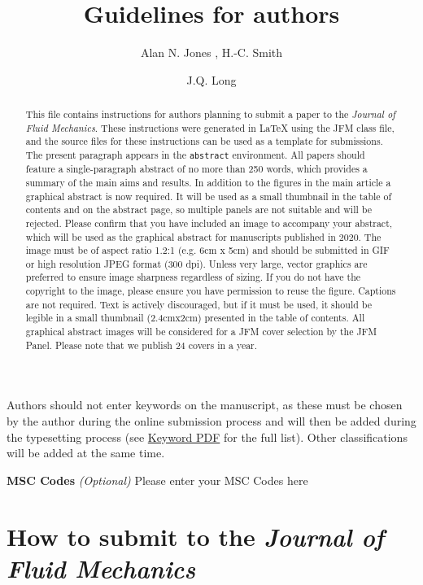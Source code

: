 \documentclass[lineno]{jfm}
\title{Guidelines for authors}
\author{Alan N. Jones\aff{1}
  \corresp{\email{JFMEditorial@cambridge.org}},
  H.-C. Smith\aff{1}
 \and J.Q. Long\aff{2}}
\affiliation{\aff{1}STM Journals, Cambridge University Press, The Printing House, Shaftesbury Road, Cambridge CB2 8BS, UK
\aff{2}DAMTP, Centre for Mathematical Sciences, Wilberforce Road, Cambridge CB3 0WA, UK}
\begin{document}
\maketitle

\begin{abstract}
This file contains instructions for authors planning to submit a paper to the {\it Journal of Fluid Mechanics}. These instructions were generated in {\LaTeX} using the JFM class file, and the source files for these instructions can be used as a template for submissions. The present paragraph appears in the \verb}abstract} environment. All papers should feature a single-paragraph abstract of no more than 250 words, which provides a summary of the main aims and results.  In addition to the figures in the main article a graphical abstract is now required. It will be used as a small thumbnail in the table of contents and on the abstract page, so multiple panels are not suitable and will be rejected. Please confirm that you have included an image to accompany your abstract, which will be used as the graphical abstract for manuscripts published in 2020. The image must be of aspect ratio 1.2:1 (e.g. 6cm x 5cm) and should be submitted in GIF or high resolution JPEG format (300 dpi). Unless very large, vector graphics are preferred to ensure image sharpness regardless of sizing. If you do not have the copyright to the image, please ensure you have permission to reuse the figure. Captions are not required. Text is actively discouraged, but if it must be used, it should be legible in a small thumbnail (2.4cmx2cm) presented in the table of contents. All graphical abstract images will be considered for a JFM cover selection by the JFM Panel. Please note that we publish 24 covers in a year.
\end{abstract}

\begin{keywords}
Authors should not enter keywords on the manuscript, as these must be chosen by the author during the online submission process and will then be added during the typesetting process (see \href{https://www.cambridge.org/core/journals/journal-of-fluid-mechanics/information/list-of-keywords}{Keyword PDF} for the full list).  Other classifications will be added at the same time.
\end{keywords}

{\bf MSC Codes }  {\it(Optional)} Please enter your MSC Codes here

\section{How to submit to the \emph{Journal of Fluid Mechanics}}
\label{sec:intro}
\end{document}
